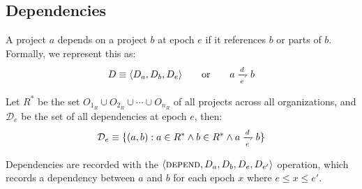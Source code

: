 \subsection{Dependencies}
\label{dependencies}

A project $a$ depends on a project $b$ at epoch $e$ if it references $b$
or parts of $b$. Formally, we represent this as:
\[
    D \equiv \tuple{D_a, D_b, D_e} \qquad \text{or} \qquad a \dep b
\]


Let $R^*$ be the set $O_{1_R} \cup O_{2_R} \cup \cdots \cup
O_{n_R}$ of all projects across all organizations, and $\mathcal{D}_e$ be the
set of all dependencies at epoch $e$, then:
\[
    \mathcal{D}_e \equiv \{(a, b) : a \in R^*
    \land b \in R^*
    \land a \dep b \}
\]

Dependencies are recorded with the $\langle \text{\normalfont\scshape depend}, D_a, D_b, D_e, D_{e'} \rangle$
operation, which records a dependency between $a$ and $b$ for each epoch $x$
where $e \leqslant x \leqslant e'$.
